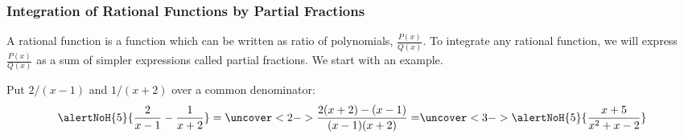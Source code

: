 \begin{frame}
\frametitle{Integration of Rational Functions by Partial Fractions}

A rational function is a function which can be written as ratio of polynomials, $\frac{P(x)}{Q(x)}$. To integrate any rational function, we will express $\frac{P(x)}{Q(x)}$ as a sum of simpler expressions called partial fractions. We start with an example.

Put $2/(x-1)$ and $1/(x+2)$ over a common denominator:
\[
\alertNoH{5}{\frac{2}{x-1} - \frac{1}{x+2} } = %
\uncover<2->{%
\frac{2(x+2) - (x-1)}{(x-1)(x+2)} = %
}%
\uncover<3->{%
\alertNoH{5}{ \frac{x + 5}{x^2+x-2} }%
}%
\]

%

\end{frame}
